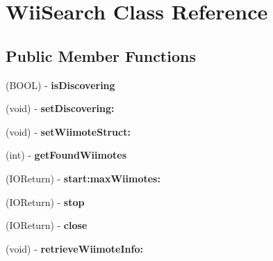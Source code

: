 \hypertarget{interface_wii_search}{\section{Wii\-Search Class Reference}
\label{interface_wii_search}
}
\subsection*{Public Member Functions}
\begin{DoxyCompactItemize}
\item 
\hypertarget{interface_wii_search_aa33564fade7c3c1e01db4262d212e260}{(B\-O\-O\-L) -\/ {\bfseries is\-Discovering}}\label{interface_wii_search_aa33564fade7c3c1e01db4262d212e260}

\item 
\hypertarget{interface_wii_search_a6db4e4c477d44817ac956aa969ffe5eb}{(void) -\/ {\bfseries set\-Discovering\-:}}\label{interface_wii_search_a6db4e4c477d44817ac956aa969ffe5eb}

\item 
\hypertarget{interface_wii_search_a9f7f99922440f3ebcad9cead56963bed}{(void) -\/ {\bfseries set\-Wiimote\-Struct\-:}}\label{interface_wii_search_a9f7f99922440f3ebcad9cead56963bed}

\item 
\hypertarget{interface_wii_search_a3bd54d2537185d929a0b999d01495845}{(int) -\/ {\bfseries get\-Found\-Wiimotes}}\label{interface_wii_search_a3bd54d2537185d929a0b999d01495845}

\item 
\hypertarget{interface_wii_search_ae02df9b6a334bd5fba04210d618fadd5}{(I\-O\-Return) -\/ {\bfseries start\-:max\-Wiimotes\-:}}\label{interface_wii_search_ae02df9b6a334bd5fba04210d618fadd5}

\item 
\hypertarget{interface_wii_search_ac0561a24f7d404d599761133808e72e7}{(I\-O\-Return) -\/ {\bfseries stop}}\label{interface_wii_search_ac0561a24f7d404d599761133808e72e7}

\item 
\hypertarget{interface_wii_search_ad3ca7558f3482774717d91da8a879c1c}{(I\-O\-Return) -\/ {\bfseries close}}\label{interface_wii_search_ad3ca7558f3482774717d91da8a879c1c}

\item 
\hypertarget{interface_wii_search_a3c8ae2c10fdfe311719d7da6e9bcfa7f}{(void) -\/ {\bfseries retrieve\-Wiimote\-Info\-:}}\label{interface_wii_search_a3c8ae2c10fdfe311719d7da6e9bcfa7f}


\end{DoxyCompactItemize}
